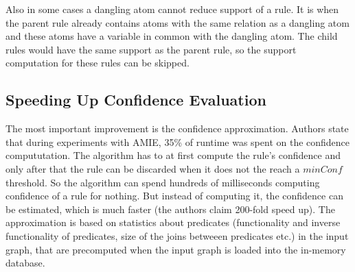 Also in some cases a dangling atom cannot reduce support of a rule. It is when the parent rule already contains atoms with the same relation as a dangling atom and these atoms have a variable in common with the dangling atom. The child rules would have the same support as the parent rule, so the support computation for these rules can be skipped.

\subsection{Speeding Up Confidence Evaluation}

The most important improvement is the confidence approximation. Authors state that during experiments with AMIE, 35\% of runtime was spent on the confidence compututation. The algorithm has to at first compute the rule's confidence and only after that the rule can be discarded when it does not the reach a $minConf$ threshold. So the algorithm can spend hundreds of milliseconds computing confidence of a rule for nothing. But instead of computing it, the confidence can be estimated, which is much faster (the authors claim 200-fold speed up). The approximation is based on statistics about predicates (functionality and inverse functionality of predicates, size of the joins betweeen predicates etc.) in the input graph, that are precomputed when the input graph is loaded into the in-memory database. 

